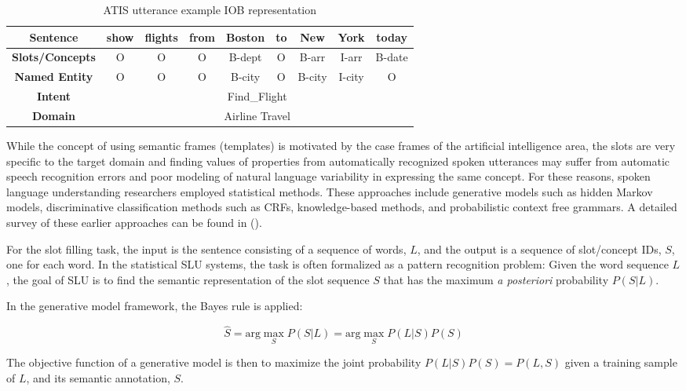 \begin{table}
\begin{tabular}{|c|c|c|c|c|c|c|c|c|}
\hline
{\bf Sentence} & show & flights & from & Boston & to & New & York & today \\
\hline
{\bf Slots/Concepts} & O & O & O & B-dept & O & B-arr & I-arr & B-date \\
\hline
{\bf Named Entity} & O & O & O & B-city & O & B-city & I-city & O \\
\hline
{\bf Intent} & \multicolumn{8}{c|}{Find\_Flight} \\
\hline
{\bf Domain} & \multicolumn{8}{c|}{Airline Travel} \\
\hline
\end{tabular}
\caption{ATIS utterance example IOB representation}
\label{fig:iob}
\end{table}

While the concept of using semantic frames (templates) is motivated by the case
frames of the artificial intelligence area, the slots are very specific to the
target domain and finding values of properties from automatically recognized
spoken utterances may suffer from automatic speech recognition errors and poor
modeling of natural language variability in expressing the same concept. For
these reasons, spoken language understanding researchers employed statistical
methods. These approaches include generative models such as hidden Markov
models, discriminative classification methods such as CRFs, knowledge-based
methods, and probabilistic context free grammars. A detailed survey of these
earlier approaches can be found in (\cite{rnn7}).

For the slot filling task, the input is the sentence consisting of a sequence
of words, $L$, and the output is a sequence of slot/concept IDs, $S$, one for each
word. In the statistical SLU systems, the task is often formalized as a pattern
recognition problem:  Given the word sequence $L$, the goal of SLU is to find the
semantic representation of the slot sequence $S$ that has the maximum {\it a
posteriori} probability $P(S | L)$. 

In the generative model framework, the Bayes rule is applied:

\begin{equation}
\hat{S} = \textrm{arg}\max_{S} P(S\vert L) = \textrm{arg}\max_{S} P(L \vert S) P (S)
\end{equation}

The objective function of a generative model is then to maximize the joint
probability $P(L | S)P(S) = P(L, S)$ given a training sample of $L$, and its semantic
annotation, $S$.

